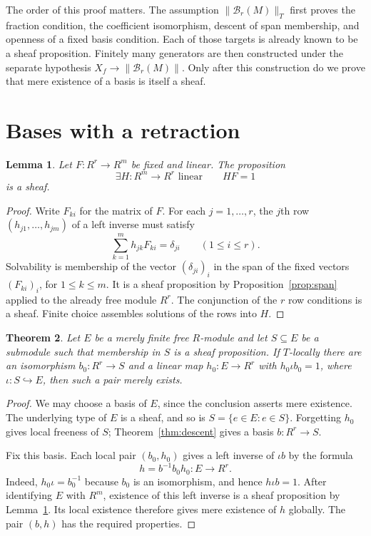 \documentclass[11pt]{amsart}
\newtheorem{theorem}{Theorem}[section]
\newtheorem{lemma}[theorem]{Lemma}
\theoremstyle{definition}
\newcommand{\Bas}{\mathcal B}
\newcommand{\tr}[1]{\lVert #1\rVert}
\newcommand{\loc}[1]{\lVert #1\rVert_T}
\begin{document}
The order of this proof matters. The assumption
$\loc{\Bas_r(M)}$ first proves the fraction condition, the coefficient
isomorphism, descent of span membership, and openness of a fixed basis
condition. Each of those targets is already known to be a sheaf
proposition. Finitely many generators are then constructed under the
separate hypothesis $X_f\to\tr{\Bas_r(M)}$. Only after this construction
do we prove that mere existence of a basis is itself a sheaf.

\section{Bases with a retraction}

\begin{lemma}\label{lem:left-inverse}
Let $F:R^r\to R^m$ be fixed and linear. The proposition
\[
 \exists H:R^m\to R^r\text{ linear}\qquad HF=1
\]
is a sheaf.
\end{lemma}
\begin{proof}
Write $F_{ki}$ for the matrix of $F$. For each $j=1,\ldots,r$, the
$j$th row $(h_{j1},\ldots,h_{jm})$ of a left inverse must satisfy
\[
 \sum_{k=1}^m h_{jk}F_{ki}=\delta_{ji}\qquad(1\leq i\leq r).
\]
Solvability is membership of the vector $(\delta_{ji})_i$ in the span of
the fixed vectors $(F_{ki})_i$, for $1\leq k\leq m$. It is a sheaf
proposition by Proposition~\ref{prop:span} applied to the already free
module $R^r$. The conjunction of the $r$ row conditions is a sheaf.
Finite choice assembles solutions of the rows into $H$.
\end{proof}

\begin{theorem}\label{thm:split}
Let $E$ be a merely finite free $R$-module and let $S\subseteq E$ be a
submodule such that membership in $S$ is a sheaf proposition. If
$T$-locally there are an isomorphism $b_0:R^r\to S$ and a linear map
$h_0:E\to R^r$ with $h_0\iota b_0=1$, where $\iota:S\hookrightarrow E$,
then such a pair merely exists.
\end{theorem}
\begin{proof}
We may choose a basis of $E$, since the conclusion asserts mere
existence. The underlying type of $E$ is a sheaf, and so is
$S=\{e\in E:e\in S\}$. Forgetting $h_0$ gives local freeness of $S$;
Theorem~\ref{thm:descent} gives a basis $b:R^r\to S$.

Fix this basis. Each local pair $(b_0,h_0)$ gives a left inverse of
$\iota b$ by the formula
\[
 h=b^{-1}b_0h_0:E\longrightarrow R^r.
\]
Indeed, $h_0\iota=b_0^{-1}$ because $b_0$ is an isomorphism, and hence
$h\iota b=1$. After identifying $E$ with $R^m$, existence of this left
inverse is a sheaf proposition by Lemma~\ref{lem:left-inverse}.
Its local existence therefore gives mere existence of $h$ globally.
The pair $(b,h)$ has the required properties.
\end{proof}
\end{document}

